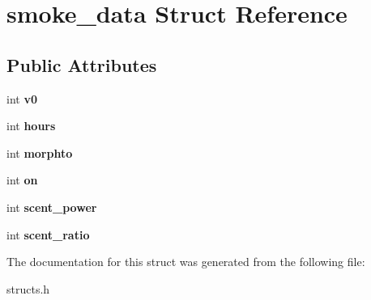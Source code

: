 \hypertarget{structsmoke__data}{\section{smoke\-\_\-data Struct Reference}
\label{structsmoke__data}
}
\subsection*{Public Attributes}
\begin{DoxyCompactItemize}
\item 
\hypertarget{structsmoke__data_ab9e0ec5cf6432e73e937d3fec4c694df}{int {\bfseries v0}}\label{structsmoke__data_ab9e0ec5cf6432e73e937d3fec4c694df}

\item 
\hypertarget{structsmoke__data_aaf3866b012d5294aa2e6100f71e6815f}{int {\bfseries hours}}\label{structsmoke__data_aaf3866b012d5294aa2e6100f71e6815f}

\item 
\hypertarget{structsmoke__data_a8eadb9e965e93cd2b445df5a07947597}{int {\bfseries morphto}}\label{structsmoke__data_a8eadb9e965e93cd2b445df5a07947597}

\item 
\hypertarget{structsmoke__data_a72d69564d6a635fc5a4af9bbbe958dcd}{int {\bfseries on}}\label{structsmoke__data_a72d69564d6a635fc5a4af9bbbe958dcd}

\item 
\hypertarget{structsmoke__data_a1357ca79de903215e0a4a8ea74d76779}{int {\bfseries scent\-\_\-power}}\label{structsmoke__data_a1357ca79de903215e0a4a8ea74d76779}

\item 
\hypertarget{structsmoke__data_af58080ad5cfb641f831c614418ecf7c3}{int {\bfseries scent\-\_\-ratio}}\label{structsmoke__data_af58080ad5cfb641f831c614418ecf7c3}

\end{DoxyCompactItemize}


The documentation for this struct was generated from the following file\-:\begin{DoxyCompactItemize}
\item 
structs.\-h\end{DoxyCompactItemize}
